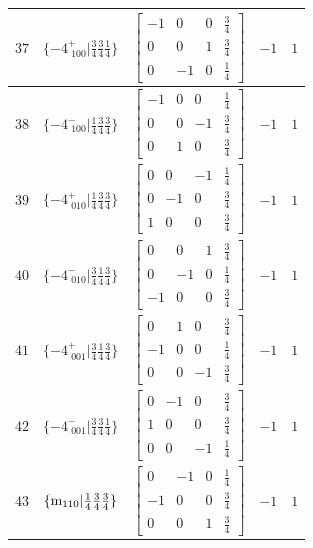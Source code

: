 \documentclass[fleqn,8pt]{jsarticle}
\begin{document}
\begin{longtable}{ccccc}
$ 37 $ & $ \{-4^{+}_{\,\,100}|\frac{3}{4} \frac{3}{4} \frac{1}{4}\} $ & $ \begin{bmatrix} -1 & 0 & 0 & \frac{3}{4} \\ 0 & 0 & 1 & \frac{3}{4} \\ 0 & -1 & 0 & \frac{1}{4} \end{bmatrix} $ & $ -1 $ & $ 1 $ \\ \hline
$ 38 $ & $ \{-4^{-}_{\,\,100}|\frac{1}{4} \frac{3}{4} \frac{3}{4}\} $ & $ \begin{bmatrix} -1 & 0 & 0 & \frac{1}{4} \\ 0 & 0 & -1 & \frac{3}{4} \\ 0 & 1 & 0 & \frac{3}{4} \end{bmatrix} $ & $ -1 $ & $ 1 $ \\ \hline
$ 39 $ & $ \{-4^{+}_{\,\,010}|\frac{1}{4} \frac{3}{4} \frac{3}{4}\} $ & $ \begin{bmatrix} 0 & 0 & -1 & \frac{1}{4} \\ 0 & -1 & 0 & \frac{3}{4} \\ 1 & 0 & 0 & \frac{3}{4} \end{bmatrix} $ & $ -1 $ & $ 1 $ \\ \hline
$ 40 $ & $ \{-4^{-}_{\,\,010}|\frac{3}{4} \frac{1}{4} \frac{3}{4}\} $ & $ \begin{bmatrix} 0 & 0 & 1 & \frac{3}{4} \\ 0 & -1 & 0 & \frac{1}{4} \\ -1 & 0 & 0 & \frac{3}{4} \end{bmatrix} $ & $ -1 $ & $ 1 $ \\ \hline
$ 41 $ & $ \{-4^{+}_{\,\,001}|\frac{3}{4} \frac{1}{4} \frac{3}{4}\} $ & $ \begin{bmatrix} 0 & 1 & 0 & \frac{3}{4} \\ -1 & 0 & 0 & \frac{1}{4} \\ 0 & 0 & -1 & \frac{3}{4} \end{bmatrix} $ & $ -1 $ & $ 1 $ \\ \hline
$ 42 $ & $ \{-4^{-}_{\,\,001}|\frac{3}{4} \frac{3}{4} \frac{1}{4}\} $ & $ \begin{bmatrix} 0 & -1 & 0 & \frac{3}{4} \\ 1 & 0 & 0 & \frac{3}{4} \\ 0 & 0 & -1 & \frac{1}{4} \end{bmatrix} $ & $ -1 $ & $ 1 $ \\ \hline
$ 43 $ & $ \{{\rm m}_{110}|\frac{1}{4} \frac{3}{4} \frac{3}{4}\} $ & $ \begin{bmatrix} 0 & -1 & 0 & \frac{1}{4} \\ -1 & 0 & 0 & \frac{3}{4} \\ 0 & 0 & 1 & \frac{3}{4} \end{bmatrix} $ & $ -1 $ & $ 1 $ \\ \hline

\end{longtable}
\end{document}

